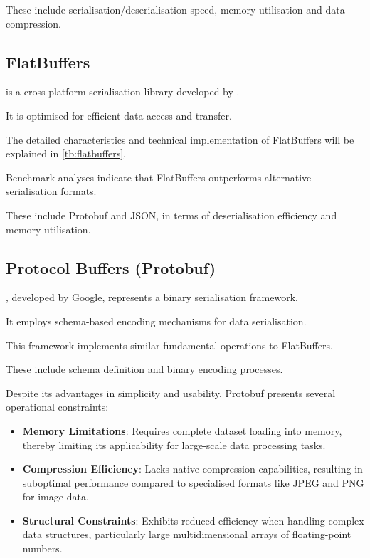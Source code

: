 These include serialisation/deserialisation speed, memory utilisation and data compression.

\subsection{FlatBuffers}
\label{rw:non_geospatial_formats:flatbuffers}

\citet{flatbuffers} is a cross-platform serialisation library developed by \citet{google_flatbuffers}.

It is optimised for efficient data access and transfer.

The detailed characteristics and technical implementation of FlatBuffers will be explained in \autoref{tb:flatbuffers}.

Benchmark analyses \citep{flatbuffers_benchmark} indicate that FlatBuffers outperforms alternative serialisation formats.

These include Protobuf \citep{protobuf} and JSON, in terms of deserialisation efficiency and memory utilisation.

\subsection{Protocol Buffers (Protobuf)}
\label{rw:non_geospatial_formats:protobuf}

\citet{protobuf}, developed by Google, represents a binary serialisation framework.

It employs schema-based encoding mechanisms for data serialisation.

This framework implements similar fundamental operations to FlatBuffers.

These include schema definition and binary encoding processes.

Despite its advantages in simplicity and usability, Protobuf presents several operational constraints:
\begin{itemize}
  \item \textbf{Memory Limitations}: Requires complete dataset loading into memory, thereby limiting its applicability for large-scale data processing tasks.
  \item \textbf{Compression Efficiency}: Lacks native compression capabilities, resulting in suboptimal performance compared to specialised formats like JPEG and PNG for image data.
  \item \textbf{Structural Constraints}: Exhibits reduced efficiency when handling complex data structures, particularly large multidimensional arrays of floating-point numbers.
\end{itemize}

